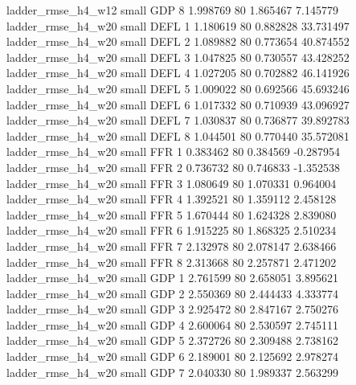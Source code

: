       ladder_rmse_h4_w12      small      GDP                 8 1.998769 80       1.865467           7.145779
      ladder_rmse_h4_w20      small     DEFL                 1 1.180619 80       0.882828          33.731497
      ladder_rmse_h4_w20      small     DEFL                 2 1.089882 80       0.773654          40.874552
      ladder_rmse_h4_w20      small     DEFL                 3 1.047825 80       0.730557          43.428252
      ladder_rmse_h4_w20      small     DEFL                 4 1.027205 80       0.702882          46.141926
      ladder_rmse_h4_w20      small     DEFL                 5 1.009022 80       0.692566          45.693246
      ladder_rmse_h4_w20      small     DEFL                 6 1.017332 80       0.710939          43.096927
      ladder_rmse_h4_w20      small     DEFL                 7 1.030837 80       0.736877          39.892783
      ladder_rmse_h4_w20      small     DEFL                 8 1.044501 80       0.770440          35.572081
      ladder_rmse_h4_w20      small      FFR                 1 0.383462 80       0.384569          -0.287954
      ladder_rmse_h4_w20      small      FFR                 2 0.736732 80       0.746833          -1.352538
      ladder_rmse_h4_w20      small      FFR                 3 1.080649 80       1.070331           0.964004
      ladder_rmse_h4_w20      small      FFR                 4 1.392521 80       1.359112           2.458128
      ladder_rmse_h4_w20      small      FFR                 5 1.670444 80       1.624328           2.839080
      ladder_rmse_h4_w20      small      FFR                 6 1.915225 80       1.868325           2.510234
      ladder_rmse_h4_w20      small      FFR                 7 2.132978 80       2.078147           2.638466
      ladder_rmse_h4_w20      small      FFR                 8 2.313668 80       2.257871           2.471202
      ladder_rmse_h4_w20      small      GDP                 1 2.761599 80       2.658051           3.895621
      ladder_rmse_h4_w20      small      GDP                 2 2.550369 80       2.444433           4.333774
      ladder_rmse_h4_w20      small      GDP                 3 2.925472 80       2.847167           2.750276
      ladder_rmse_h4_w20      small      GDP                 4 2.600064 80       2.530597           2.745111
      ladder_rmse_h4_w20      small      GDP                 5 2.372726 80       2.309488           2.738162
      ladder_rmse_h4_w20      small      GDP                 6 2.189001 80       2.125692           2.978274
      ladder_rmse_h4_w20      small      GDP                 7 2.040330 80       1.989337           2.563299
